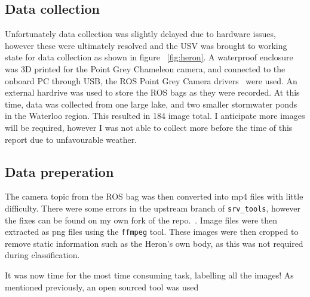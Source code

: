 \documentclass[10pt,twocolumn,letterpaper]{article}
\begin{document}
\subsection{Data collection}
Unfortunately data collection was slightly delayed due to hardware issues, however these were
ultimately resolved and the USV was brought to working state for data collection as shown in figure 
~\ref{fig:heron}. A waterproof enclosure was 3D printed for the Point Grey Chameleon camera, and connected
to the onboard PC through USB, the ROS Point Grey Camera drivers~\cite{PointGreyDrivers} were used. An
external hardrive was used to store the ROS bags as they were recorded. At this time, data was collected from
one large lake, and two smaller stormwater ponds in the Waterloo region. This resulted in 184 image total.
I anticipate more images will be required, however I was not able to collect more before the time of this
report due to unfavourable weather. 

\subsection{Data preperation}
The camera topic from the ROS bag was then converted into mp4 files with little difficulty. There were some
errors in the upstream branch of \verb|srv_tools|, however the fixes can be found on my own fork of the
 repo.~\cite{srvtoolsfork}. Image files were then extracted as png files using the \verb|ffmpeg| tool. 
 These images were then cropped to remove static information such as the Heron's own body, as this was not
 required during classification.

It was now time for the most time consuming task, labelling all the images! As mentioned previously, an
open sourced tool was used
\end{document}
